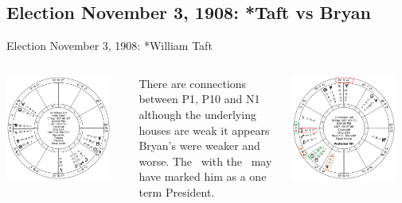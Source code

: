 \subsection{Election November 3, 1908: *Taft vs Bryan}
\begin{frame}[t]{Election November 3, 1908: *William Taft}
\small
\begin{columns}[T, onlytextwidth]
\vspace{-1em}
{\includegraphics[width=0.9\textwidth]{charts/Taft.png}}
\fontsize{7pt}{8pt}\selectfont

There are connections between P1, P10 and N1 although the underlying houses are weak it appears Bryan's were weaker and worse. The \Sun\, with the \SouthNode\, may have marked him as a one term President.

\vspace{-1em}
{\includegraphics[width=0.9\textwidth]{charts/Taft-Prof-4th.png}}


\end{columns}
\end{frame}
